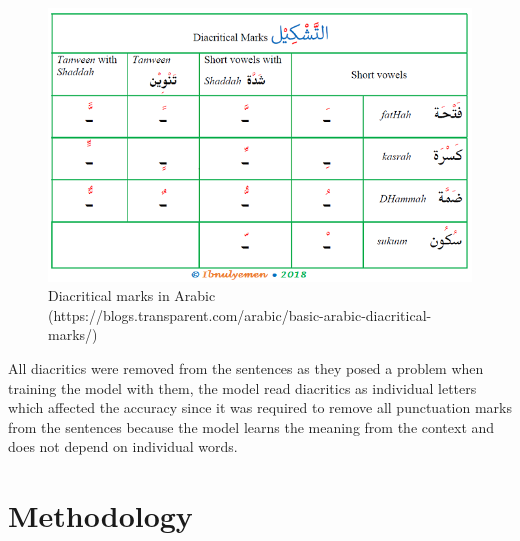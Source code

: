 \documentclass[
  a4paper,
]{article}
\begin{document}
\begin{figure}

{\centering \includegraphics{diacritics} 

}

\caption{Diacritical marks in Arabic (https://blogs.transparent.com/arabic/basic-arabic-diacritical-marks/)}\label{fig:diacritics}
\end{figure}

All diacritics were removed from the sentences as they posed a problem
when training the model with them, the model read diacritics as
individual letters which affected the accuracy since it was required to
remove all punctuation marks from the sentences because the model learns
the meaning from the context and does not depend on individual words.

\newpage

\hypertarget{methodology}{%
\section{Methodology}\label{methodology}}
\end{document}
